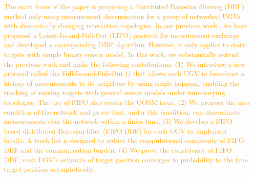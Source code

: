 	\textcolor{orange}{
	The main focus of the paper is proposing a distributed Bayesian filtering (DBF) method only using measurement dissemination for a group of networked UGVs with dynamically changing interaction topologies. 
	In our previous work \cite{liu2016distributed}, we have proposed a Latest-In-and-Full-Out (LIFO) protocol for measurement exchange and developed a corresponding DBF algorithm.
	However, it only applies to static targets with simple binary sensor model.
	In this work, we substantially extend the previous work and make the following contributions:
	(1) We introduce a new protocol called the Full-In-and-Full-Out (\proto) that allows each UGV to broadcast a history of measurements to its neighbors by using single-hopping, enabling the tracking of moving targets with general sensor models under time-varying topologies. The use of FIFO also avoids the OOSM issue.
	(2) We propose the {\fc ness} condition of the network and prove that, under this condition, {\proto} can disseminate measurements over the network within a finite time.
	(3) We develop a FIFO-based distributed Bayesian filter (FIFO-DBF) for each UGV to implement locally. A track list is designed to reduce the computational complexity of FIFO-DBF and the communication burden.
	(4) We prove the consistency of FIFO-DBF: each UGV's estimate of target position converges in probability to the true target position asymptotically.}
	
